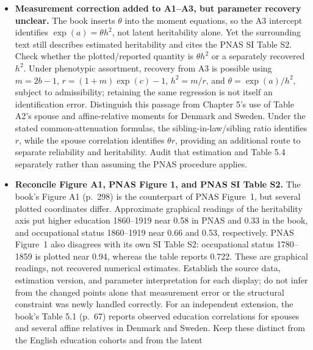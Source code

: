 \begin{itemize}
factor $(1+r)/(1+m)$ from different attenuation factors? The same question
arises for the single-grandparent moment relative to the aunt/uncle moment.
Specify whether reliability varies by historical generation or by the
number of generations separating a pair, derive the resulting pair-level
attenuation factors, and establish what additional restrictions or moments
would separate measurement error from the effects of $r$ versus $m$.
\item \textbf{Measurement correction added to A1--A3, but parameter recovery unclear.}
The book inserts $\theta$ into the moment equations, so the A3 intercept
identifies $\exp(a)=\theta h^2$, not latent heritability alone. Yet the
surrounding text still describes estimated heritability and cites the PNAS
SI Table S2. Check whether the plotted/reported quantity is $\theta h^2$
or a separately recovered $h^2$. Under phenotypic assortment, recovery
from A3 is possible using $m=2b-1$, $r=(1+m)\exp(c)-1$, $h^2=m/r$,
and $\theta=\exp(a)/h^2$, subject to admissibility; retaining the same
regression is not itself an identification error. Distinguish this
passage from Chapter 5's use of Table A2's spouse and affine-relative
moments for Denmark and Sweden. Under the stated common-attenuation
formulas, the sibling-in-law/sibling ratio identifies $r$, while the
spouse correlation identifies $\theta r$, providing an additional route
to separate reliability and heritability. Audit that estimation and
Table 5.4 separately rather than assuming the PNAS procedure applies.
\item \textbf{Reconcile Figure A1, PNAS Figure 1, and PNAS SI Table S2.}
The book's Figure A1 (p.~298) is the counterpart of PNAS Figure~1,
but several plotted coordinates differ. Approximate graphical readings
of the heritability axis put higher education 1860--1919 near 0.58 in
PNAS and 0.33 in the book, and occupational status 1860--1919 near
0.66 and 0.53, respectively. PNAS Figure~1 also disagrees with its own
SI Table S2: occupational status 1780--1859 is plotted near 0.94,
whereas the table reports 0.722. These are graphical readings, not
recovered numerical estimates. Establish the source data, estimation
version, and parameter interpretation for each display; do not infer
from the changed points alone that measurement error or the structural
constraint was newly handled correctly. For an independent extension,
the book's Table 5.1 (p.~67) reports observed education correlations for
spouses and several affine relatives in Denmark and Sweden. Keep these
distinct from the English education cohorts and from the latent

\end{itemize}
